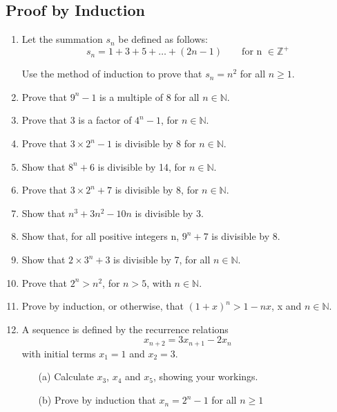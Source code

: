 \documentclass[]{report}
\begin{document}
\large
	
\subsection*{Proof by Induction}
\begin{enumerate}
\item Let the summation $s_n$ be defined as follows:
\[s_n = 1 + 3 + 5 + \ldots + (2n - 1) \qquad \mbox{for n }\in \mathbb{Z}^{+}\]

Use the method of induction to prove that $s_n = n^2$ for all $n \geq 1$.

\item Prove that $9^{n} - 1$ is a multiple of 8 for all $n \in \mathbb{N}.$
\item Prove that 3 is a factor of $4^{n} - 1$, for $n \in \mathbb{N}.$
\item Prove that $3\times 2^{n} - 1$ is divisible by 8 for $n \in \mathbb{N}.$
\item Show that $8^{n} + 6$ is divisible by 14, for $n \in \mathbb{N}.$
\item Prove that $3\times 2^{n} + 7$ is divisible by 8, for $n \in \mathbb{N}.$
\item Show that $n^3 + 3n^2 - 10n$ is divisible by 3. 

\item Show that, for all positive integers n, $9^{n} + 7$ is divisible by 8. 
\item  Show that $2\times 3^{n} + 3$ is divisible by 7, for all $n \in \mathbb{N}.$
\item  Prove that $2^{n} > n^2$, for $n > 5$, with $n \in \mathbb{N}.$
\item Prove by induction, or otherwise, that $(1 + x)^{n} >1 - nx$, x and $n \in \mathbb{N}$. 

\item 
A sequence is defined by the recurrence relations
\[x_{n+2}  = 3x_{n+1} - 2x_n\]
with initial terms $x_1 = 1$ and $x_2=3$.

\begin{itemize}
\item[(a)] Calculate $x_3$, $x_4$ and $x_5$, showing your workings.
\item[(b)] Prove by induction that $x_n = 2^n - 1$ for all $n \geq 1$
\end{itemize}

\end{enumerate}
\end{document}
